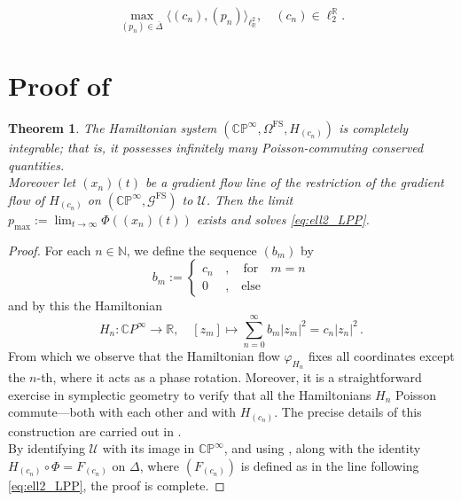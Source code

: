 \documentclass[10pt,a4paper]{amsart}
\newtheorem{theorem}{Theorem}
\newcommand{\R}{\mathbb{R}}
\begin{document}
\begin{equation}\tag{LP}\label{eq:ell2_LPP}
	\max_{(p_n)\in \bar{\Delta}} \langle (c_n), (p_n) \rangle_{\ell^2_\R}, \quad (c_n)\in \ell_2^\R.
\end{equation}

\section{Proof of }\label{Appendix proof of integrability of Hamiltonian system}

\begin{theorem}\label{t: integrability of Hamiltonian system}
The Hamiltonian system \( (\mathbb{CP}^\infty, \Omega^{\mathrm{FS}}, H_{(c_n)}) \) is completely integrable; that is, it possesses infinitely many Poisson-commuting conserved quantities. \\
Moreover let \( (x_n)(t) \) be a gradient flow line of the restriction of the gradient flow of \( H_{(c_n)} \) on \( (\mathbb{CP}^\infty, \mathcal{G}^{\mathrm{FS}}) \) to \( \mathcal{U} \). Then the limit $p_{\max} := \lim_{t \to \infty} \varPhi\left((x_n)(t)\right)$ exists and solves \eqref{eq:ell2_LPP}.
\end{theorem}

\begin{proof}
 For each \( n \in \mathbb{N} \), we define the sequence $(b_m)$ by 
 \[
b_m:=\begin{cases}
    c_n\, &, \quad\text{for} \quad m=n\\
    0\, &, \quad \text{else}
\end{cases}
 \]
and by this the Hamiltonian
\begin{equation}\label{eq: Hamiltonians on CP inf for integrability}
	H_n : \mathbb{C}P^\infty \longrightarrow \mathbb{R}, \quad [z_m] \mapsto  \sum_{n=0}^{\infty}b_m |z_m|^2= c_n|z_n|^2\, .
\end{equation}
From which we observe that the Hamiltonian flow \( \varphi_{H_n} \) fixes all coordinates except the \( n \)-th, where it acts as a phase rotation.  
Moreover, it is a straightforward exercise in symplectic geometry to verify that all the Hamiltonians \( H_n \) Poisson commute—both with each other and with \( H_{(c_n)} \). The precise details of this construction are carried out in .\\
By identifying \( \mathcal{U} \) with its image in \( \mathbb{CP}^\infty \), and using , along with the identity $H_{(c_n)} \circ \varPhi = F_{(c_n)}$ on $\Delta$,
where \( (F_{(c_n)}) \) is defined as in the line following \eqref{eq:ell2_LPP}, the proof is complete.
\end{proof}
\end{document}
